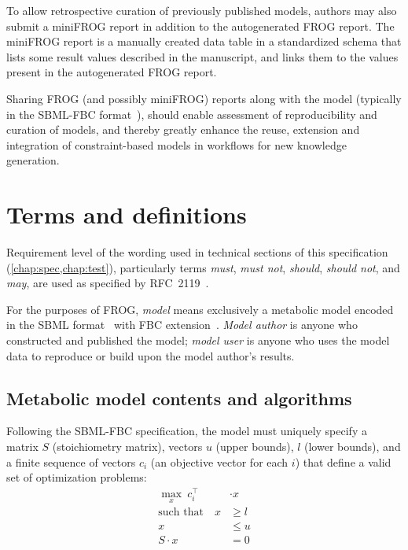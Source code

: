 To allow retrospective curation of previously published models, authors may also submit a miniFROG report in addition to the autogenerated FROG report. The miniFROG report is a manually created data table in a standardized schema that lists some result values described in the manuscript, and links them to the values present in the autogenerated FROG report.

Sharing FROG (and possibly miniFROG) reports along with the model (typically in the SBML-FBC format~\cite{olivier2018sbmlfbc}), should enable assessment of reproducibility and curation of models, and thereby greatly enhance the reuse, extension and integration of constraint-based models in workflows for new knowledge generation.

\section{Terms and definitions}

Requirement level of the wording used in technical sections of this specification (\cref{chap:spec,chap:test}), particularly terms \emph{must}, \emph{must not}, \emph{should}, \emph{should not}, and \emph{may}, are used as specified by RFC~2119~\cite{rfc2119}.

For the purposes of FROG, \emph{model} means exclusively a metabolic model encoded in the SBML format~\cite{hucka2003systems,keating2020sbml} with FBC extension~\cite{olivier2018sbmlfbc}. \emph{Model author} is anyone who constructed and published the model; \emph{model user} is anyone who uses the model data to reproduce or build upon the model author's results.

\subsection{Metabolic model contents and algorithms}
\label{sec:algos}

Following the SBML-FBC specification, the model must uniquely specify a matrix $S$ (stoichiometry matrix), vectors $u$ (upper bounds), $l$ (lower bounds), and a finite sequence of vectors $c_i$ (an objective vector for each $i$) that define a valid set of optimization problems:
\begin{align*}
\max_x\ c_i^\intercal &\cdot x \\
\text{such that}\quad
x & \geq l \\
x & \leq u \\
S\cdot x &= 0
\end{align*}

